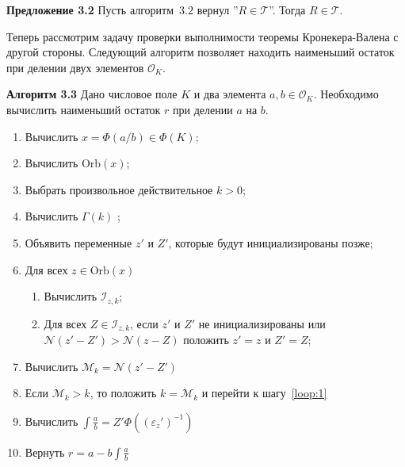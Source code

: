\documentclass[_00_autoref.tex]{subfiles}
\begin{document}
\textbf{Предложение 3.2}
    Пусть алгоритм~$3.2$ вернул ''$R \in \mathcal{T}$''.
    Тогда $R \in \mathcal{T}$.



Теперь рассмотрим задачу проверки выполнимости теоремы Кронекера-Валена с другой стороны.
Следующий алгоритм позволяет находить наименьший остаток при делении двух элементов $\mathcal{O}_K$.

\textbf{Алгоритм 3.3}\label{algorithm:least_norm_remainder}
    Дано числовое поле $K$ и два элемента $a, b \in \mathcal{O}_K$.
    Необходимо вычислить наименьший остаток $r$ при делении $a$ на $b$.

    \begin{enumerate}
        \item Вычислить $x = \Phi(a/b) \in \Phi(K)$;
        
        \item Вычислить $\textrm{Orb}(x)$;

        \item Выбрать произвольное действительное $k > 0$;

        \item Вычислить $\Gamma(k)$ \label{loop:1};

        \item Объявить переменные $z'$ и $Z'$, которые будут инициализированы позже;

        \item Для всех $z \in \textrm{Orb}(x)$
        \begin{enumerate}
            \item Вычислить $\mathcal{I}_{z, k}$;

            \item Для всех $Z \in \mathcal{I}_{z, k}$, если $z'$ и $Z'$ не инициализированы или $\mathcal{N}(z' - Z') > \mathcal{N}(z - Z)$ положить $z' = z$ и $Z' = Z$;
        \end{enumerate}

        \item Вычислить $\mathcal{M}_k = \mathcal{N}(z' - Z')$
        
        \item Если $\mathcal{M}_k > k$, то положить $k = \mathcal{M}_k$ и перейти к шагу~\ref{loop:1}

        \item Вычислить $\int{\frac{a}{b}} = Z'\Phi((\varepsilon_z')^{-1})$

        \item Вернуть $r = a - b \int{\frac{a}{b}}$
    \end{enumerate}
\end{document}
